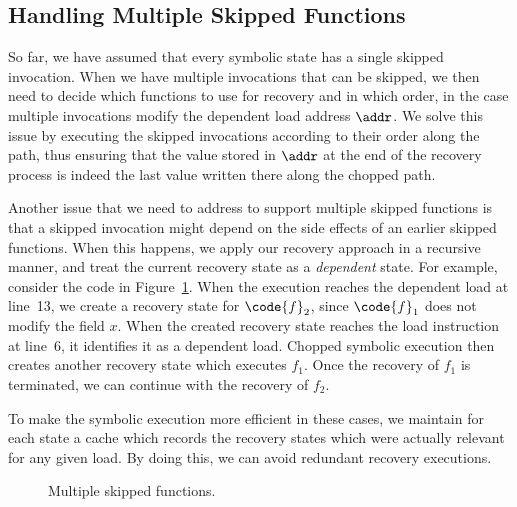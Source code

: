 
\subsection{Handling Multiple Skipped Functions}
\label{Se:SkipMultipleFuncs}
So far, we have assumed that every symbolic state has a single skipped
invocation. When we have multiple invocations that can be skipped, we
then need to decide which functions to use for recovery and in which
order, in the case multiple invocations modify the dependent load
address $\addr$. We solve this issue by executing the skipped
invocations according to their order along the path, thus ensuring
that the value stored in $\addr$ at the end of the recovery process is
indeed the last value written there along the chopped path.

Another issue that we need to address to support multiple skipped
functions is that a skipped invocation might depend on the side
effects of an earlier skipped functions. When this happens, we apply
our recovery approach in a recursive manner, and treat the current
recovery state as a \emph{dependent} state. For example, consider the
code in Figure~\ref{fig:multiple-skipped-functions}. When the
execution reaches the dependent load at line~13, we create a recovery
state for $\code{f}_2$, since $\code{f}_1$ does not modify the field
$x$.  When the created recovery state reaches the load instruction at
line~6, it identifies it as a dependent load. Chopped symbolic
execution then creates another recovery state which executes $f_1$.
Once the recovery of $f_1$ is terminated, we can continue with the
recovery of $f_2$.

To make the symbolic execution more efficient in these cases, we
maintain for each state a cache which records the recovery states
which were actually relevant for any given load. By doing this, we can
avoid redundant recovery executions.

\begin{figure}[tbp]

\caption{Multiple skipped functions.}\vspace{-5mm}
\label{fig:multiple-skipped-functions}
\end{figure}

